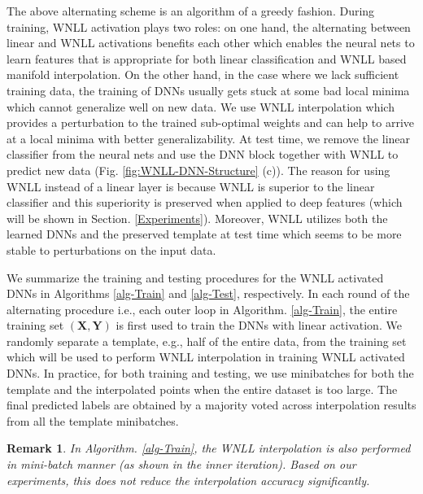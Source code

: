 \documentclass{article}
\newtheorem{remark}{Remark}
\begin{document}
The above alternating scheme is an algorithm of a greedy fashion. During training, WNLL activation plays two roles: on one hand, the alternating between linear and WNLL activations benefits each other which enables the neural nets to learn features that is appropriate for both linear classification and WNLL based manifold interpolation. On the other hand, in the case where we lack sufficient training data, the training of DNNs usually gets stuck at some bad local minima which cannot generalize well on new data. We use WNLL interpolation which provides a perturbation to the trained sub-optimal weights and can help to arrive at a local minima with better generalizability. At test time, we remove the linear classifier from the neural nets and use the DNN block together with WNLL to predict new data (Fig. \ref{fig:WNLL-DNN-Structure} (c)). The reason for using WNLL instead of a linear layer is because WNLL is superior to the linear classifier and this superiority is preserved when applied to deep features (which will be shown in Section. \ref{Experiments}). Moreover, WNLL utilizes both the learned DNNs and the preserved template at test time which seems to be more stable to perturbations on the input data.


We summarize the training and testing procedures for the WNLL activated DNNs in Algorithms \ref{alg-Train} and \ref{alg-Test}, respectively. In each round of the alternating procedure i.e., each outer loop in Algorithm. \ref{alg-Train}, the entire training set $(\mathbf{X}, \mathbf{Y})$ is first used to train the DNNs with linear activation. We randomly separate a template, e.g., half of the entire data, from the training set which will be used to perform WNLL interpolation in training WNLL activated DNNs. In practice, for both training and testing, we use minibatches for both the template and the interpolated points when the entire dataset is too large. The final predicted labels are obtained by a majority voted across interpolation results from all the template minibatches. 

\begin{remark}
In Algorithm. \ref{alg-Train}, the WNLL interpolation is also performed in mini-batch manner (as shown in the inner iteration). Based on our experiments, this does not reduce the interpolation accuracy significantly.
\end{remark}
\end{document}
